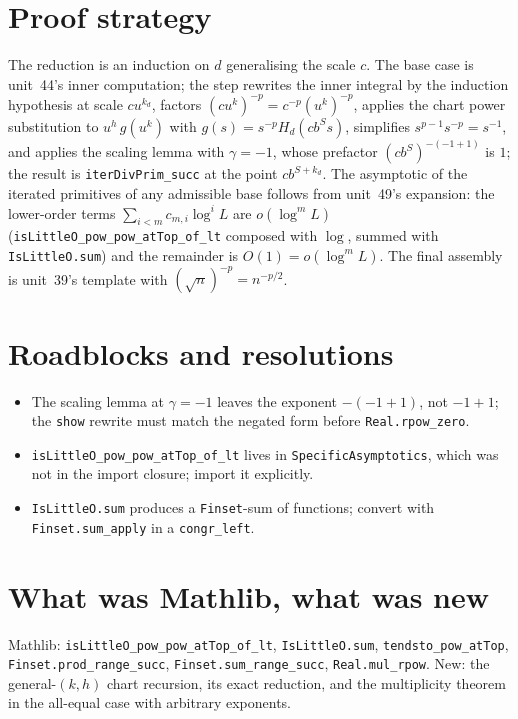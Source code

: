 \documentclass[11pt]{article}
\begin{document}
\section{Proof strategy}
The reduction is an induction on $d$ generalising the scale $c$. The base case is unit~44's inner
computation; the step rewrites the inner integral by the induction hypothesis at scale $cu^{k_d}$,
factors $(cu^{k})^{-p}=c^{-p}(u^k)^{-p}$, applies the chart power substitution to
$u^{h}\,g(u^{k})$ with $g(s)=s^{-p}H_d(cb^Ss)$, simplifies $s^{p-1}s^{-p}=s^{-1}$, and applies the
scaling lemma with $\gamma=-1$, whose prefactor $(cb^S)^{-(-1+1)}$ is $1$; the result is
\texttt{iterDivPrim\_succ} at the point $cb^{S+k_d}$. The asymptotic of the iterated primitives of
any admissible base follows from unit~49's expansion: the lower-order terms $\sum_{i<m}c_{m,i}\log^iL$
are $o(\log^mL)$ (\texttt{isLittleO\_pow\_pow\_atTop\_of\_lt} composed with $\log$, summed with
\texttt{IsLittleO.sum}) and the remainder is $O(1)=o(\log^mL)$. The final assembly is unit~39's
template with $(\sqrt n)^{-p}=n^{-p/2}$.

\section{Roadblocks and resolutions}
\begin{itemize}
\item The scaling lemma at $\gamma=-1$ leaves the exponent $-(-1+1)$, not $-1+1$; the
\texttt{show} rewrite must match the negated form before \texttt{Real.rpow\_zero}.
\item \texttt{isLittleO\_pow\_pow\_atTop\_of\_lt} lives in \texttt{SpecificAsymptotics}, which was not
in the import closure; import it explicitly.
\item \texttt{IsLittleO.sum} produces a \texttt{Finset}-sum of functions; convert with
\texttt{Finset.sum\_apply} in a \texttt{congr\_left}.
\end{itemize}

\section{What was Mathlib, what was new}
Mathlib: \texttt{isLittleO\_pow\_pow\_atTop\_of\_lt}, \texttt{IsLittleO.sum}, \texttt{tendsto\_pow\_atTop},
\texttt{Finset.prod\_range\_succ}, \texttt{Finset.sum\_range\_succ}, \texttt{Real.mul\_rpow}. New: the
general-$(k,h)$ chart recursion, its exact reduction, and the multiplicity theorem in the all-equal case
with arbitrary exponents.
\end{document}
